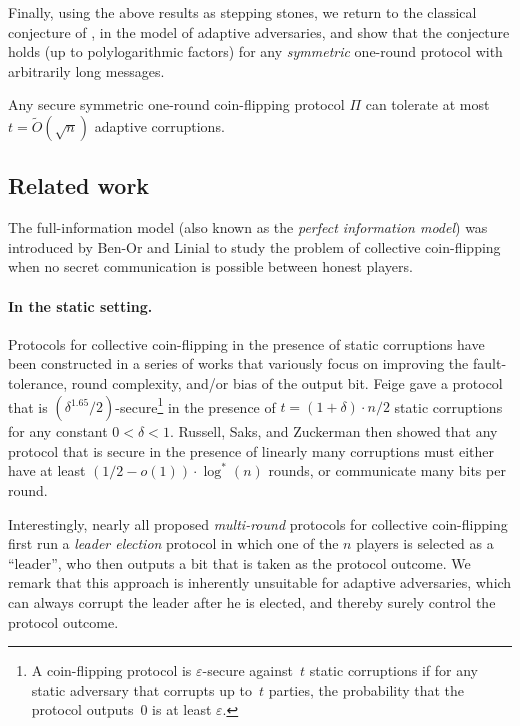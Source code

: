 \documentclass[11pt,letterpaper]{article}
\theoremstyle{plain}
\theoremstyle{definition}
\newenvironment{informalthm}
  {\medskip\noindent{\bf Theorem.}}
  {\medskip}
\newcommand{\eps}{\varepsilon}
\begin{document}
Finally, using the above results as stepping stones, we return to the classical conjecture of \cite{BL85},  in the model of adaptive adversaries, and show that the conjecture holds (up to polylogarithmic factors)
for any \emph{symmetric} one-round protocol with arbitrarily long messages.

\begin{informalthm}
Any secure symmetric one-round coin-flipping protocol $\Pi$ can tolerate at most $t=\widetilde{O}(\sqrt n)$ adaptive corruptions.
\end{informalthm}

 


\subsection{Related work}\label{related-work}

The full-information model (also known as the \emph{perfect information model}) was introduced by Ben-Or and Linial \cite{BL85} 
to study the problem of collective coin-flipping when no secret communication is possible between honest players.

\paragraph{In the static setting.}
Protocols for collective coin-flipping in the presence of static corruptions have been constructed in a series of works that variously focus on improving the fault-tolerance, round complexity, and/or bias of the output bit.
Feige \cite{Fei99} gave a protocol that is $(\delta^{1.65}/2)$-secure\footnote{A
coin-flipping protocol is $\eps$-secure against~$t$ static corruptions if for any static adversary that corrupts up to~$t$ parties, 
the probability that the protocol outputs~$0$ is at least $\eps$.}
in the presence of $t=(1+\delta)\cdot n/2$ static corruptions for any constant $0<\delta<1$.
Russell, Saks, and Zuckerman \cite{RSZ02} then showed that any protocol that is secure in the presence of linearly many corruptions must
either have at least $(1/2-o(1))\cdot\log^*(n)$ rounds, or communicate many bits per round.

Interestingly, nearly all proposed \emph{multi-round} protocols for collective coin-flipping
first run a \emph{leader election} protocol in which one of the $n$ players is selected as a ``leader'', who then outputs a bit that is taken as the protocol outcome.
We remark that this approach is inherently unsuitable for adaptive adversaries, which can always corrupt the leader after he is elected, 
and thereby surely control the protocol outcome.
\end{document}
